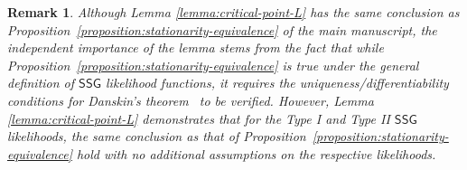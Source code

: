 \documentclass[12pt]{article}
\newtheorem{remark}{Remark}[section]
\numberwithin{equation}{section}
\newcommand{\ssg}{\mathsf{SSG}}
\begin{document}
\begin{remark}
Although Lemma \ref{lemma:critical-point-L} has the same conclusion as Proposition~\ref{proposition:stationarity-equivalence} of the main manuscript, the independent importance of the lemma stems from the fact that while Proposition~\ref{proposition:stationarity-equivalence} is true under the general definition of $\ssg$ likelihood functions, it requires the uniqueness/differentiability conditions for Danskin's theorem~\citep{Danskin1967} to be verified. However, Lemma \ref{lemma:critical-point-L} demonstrates that for the Type I and Type II $\ssg$ likelihoods, the same conclusion as that of Proposition~\ref{proposition:stationarity-equivalence} hold with no additional assumptions on the respective likelihoods.
\end{remark}
\end{document}
